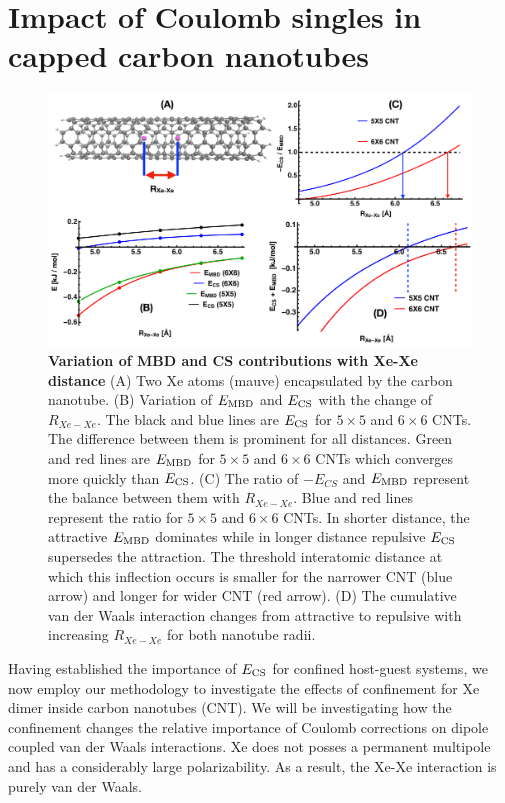 \documentclass[aps,prl,groupaddress, twocolumn]{revtex4-1}  %
\begin{document}
\section*{Impact of Coulomb singles in capped carbon nanotubes}
\begin{figure}[hbtp]
\includegraphics[scale=0.5, width=\textwidth]{Plots/CNTplots.pdf}
\caption{\textbf{Variation of MBD and CS contributions with Xe-Xe distance} (A) Two Xe atoms (mauve) encapsulated by the carbon nanotube. (B) Variation of $E_{\rm MBD}$ and $E_{\rm CS}$ with the change of $R_{Xe-Xe}$. The black and blue lines are $E_{\rm CS}$ for $5 \times 5$ and $6 \times 6$ CNTs. The difference between them is prominent for all distances. Green and red lines are $E_{\rm MBD}$ for $5 \times 5$ and $6 \times 6$ CNTs which converges more quickly than $E_{\rm CS}$. (C) The ratio of $-E_{CS}$ and $E_{\rm MBD}$ represent the balance between them with $R_{Xe-Xe}$. Blue and red lines represent the ratio for $5\times5$ and $6\times6$ CNTs. In shorter distance, the attractive $E_{\rm MBD}$ dominates while in longer distance repulsive $E_{\rm CS}$ supersedes the attraction. The threshold interatomic distance at which this inflection occurs is smaller for the narrower CNT (blue arrow) and longer for wider CNT (red arrow). (D) The cumulative van der Waals interaction changes from attractive to repulsive with increasing $R_{Xe-Xe}$ for both nanotube radii.}\label{fig:CNT}
\end{figure}
Having established the importance of $E_{\rm CS}$ for confined host-guest systems, we now employ our methodology to investigate the effects of confinement for Xe dimer inside carbon nanotubes (CNT). We will be investigating how the confinement changes the relative importance of Coulomb corrections on dipole coupled van der Waals interactions. Xe does not posses a permanent multipole and has a considerably large polarizability. As a result, the Xe-Xe interaction is purely van der Waals. 
\end{document}
